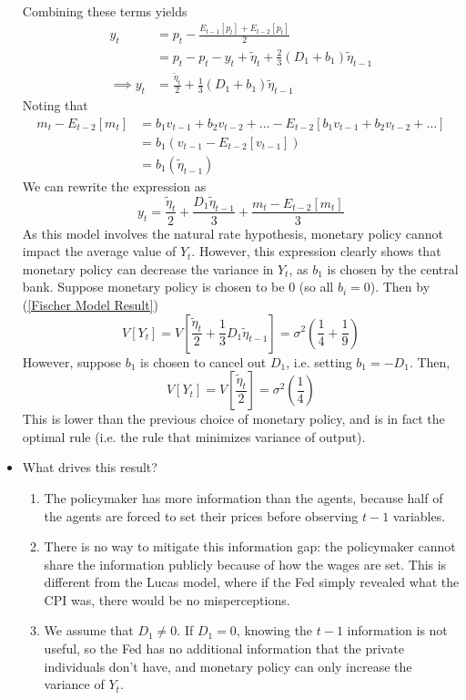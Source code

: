 \documentclass[12pt]{article}
\begin{document}
\begin{itemize}
\[\begin{split}
    \end{split}\]
    Combining these terms yields
    \begin{equation}\label{Fischer Model Result}
        \begin{split}
        y_t &= p_t - \frac{E_{t-1}[p_t] + E_{t-2}[p_t]}{2} \\
        &= p_t - p_t - y_t + \widetilde{\eta}_t + \frac{2}{3}(D_1 + b_1)\widetilde{\eta}_{t-1} \\
        \implies y_t &= \frac{\widetilde{\eta}_t}{2} + \frac{1}{3}(D_1 + b_1)\widetilde{\eta}_{t-1}
        \end{split}
    \end{equation}
    Noting that 
    \[\begin{split}
        m_t - E_{t-2}[m_t] &= b_1v_{t-1} + b_2v_{t-2} + \hdots - E_{t-2}[b_1v_{t-1} + b_2v_{t-2} + \hdots] \\
        &= b_1(v_{t-1} - E_{t-2}[v_{t-1}]) \\
        &= b_1(\widetilde{\eta}_{t-1})
    \end{split}\]
    We can rewrite the expression as
    \begin{equation}\label{Fischer Model Result Slides}
        \boxed{y_t = \frac{\widetilde{\eta}_t}{2} + \frac{D_1\widetilde{\eta}_{t-1}}{3} + \frac{m_t - E_{t-2}[m_t]}{3}}
    \end{equation}
    As this model involves the natural rate hypothesis, monetary policy cannot impact the average value of $Y_t$. However, this expression clearly shows that monetary policy can decrease the variance in $Y_t$, as $b_1$ is chosen by the central bank. Suppose monetary policy is chosen to be 0 (so all $b_i = 0$). Then by (\ref{Fischer Model Result})
    \[V[Y_t] = V\left[\frac{\widetilde{\eta}_t}{2} + \frac{1}{3}D_1\widetilde{\eta}_{t-1}\right] = \sigma^2 \left(\frac{1}{4} + \frac{1}{9}\right)\]
    However, suppose $b_1$ is chosen to cancel out $D_1$, i.e. setting $b_1 = -D_1$. Then,
    \[V[Y_t] = V\left[\frac{\widetilde{\eta}_t}{2} \right] = \sigma^2 \left(\frac{1}{4}\right)\]
    This is lower than the previous choice of monetary policy, and is in fact the optimal rule (i.e. the rule that minimizes variance of output).
    \item What drives this result?
    \begin{enumerate}
        \item The policymaker has more information than the agents, because half of the agents are forced to set their prices before observing $t-1$ variables.
        \item There is no way to mitigate this information gap: the policymaker cannot share the information publicly because of how the wages are set. This is different from the Lucas model, where if the Fed simply revealed what the CPI was, there would be no misperceptions.
        \item We assume that $D_1 \neq 0$. If $D_1 = 0$, knowing the $t-1$ information is not useful, so the Fed has no additional information that the private individuals don't have, and monetary policy can only increase the variance of $Y_t$.
    \end{enumerate}
\end{itemize}
\end{document}
